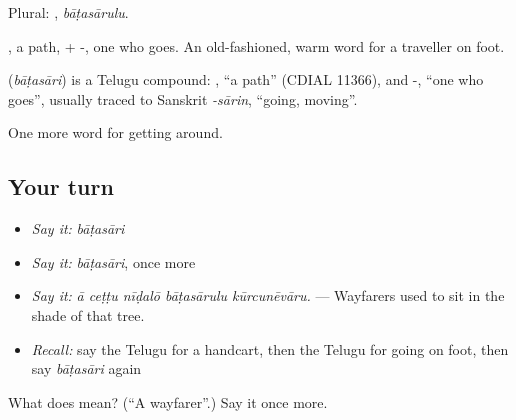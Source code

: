 Plural: , \emph{bāṭasārulu}.

, a path, + -, one who goes. An old-fashioned, warm word for a traveller on foot.

\begin{cousinweb}
\textbf{} (\emph{bāṭasāri}) is a Telugu compound: , \textquotedblleft{}a path\textquotedblright{} (CDIAL 11366), and -, \textquotedblleft{}one who goes\textquotedblright{}, usually traced to Sanskrit \emph{-sārin}, \textquotedblleft{}going, moving\textquotedblright{}.
\end{cousinweb}

\begin{grammarlens}[title={What you've built}]
One more word for getting around.
\end{grammarlens}

\subsection*{Your turn}
\begin{itemize}
\raggedright
  \item \emph{Say it:} \emph{bāṭasāri}
  \item \emph{Say it:} \emph{bāṭasāri}, once more
  \item \emph{Say it:} \emph{ā ceṭṭu nīḍalō bāṭasārulu kūrcunēvāru.} — Wayfarers used to sit in the shade of that tree.
  \item \emph{Recall:} say the Telugu for a handcart, then the Telugu for going on foot, then say \emph{bāṭasāri} again
\end{itemize}

\begin{tcolorbox}[breakable,colback=teal!4,colframe=teal!35!black,title={Before you move on}]
What does  mean? (\textquotedblleft{}A wayfarer\textquotedblright{}.) Say it once more.
\end{tcolorbox}
